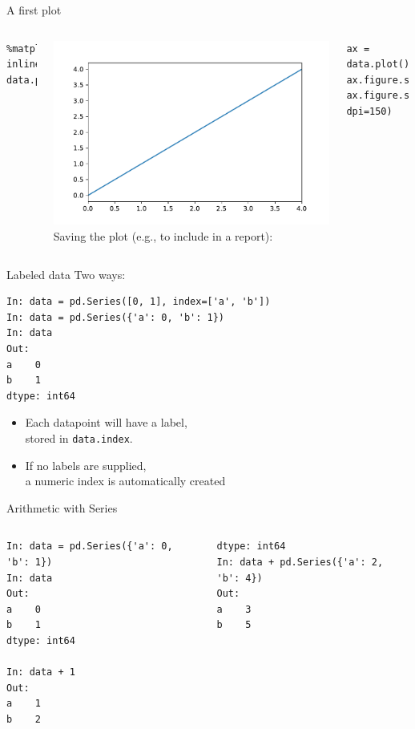 \documentclass[aspectratio=169,usenames,dvipsnames]{beamer}
\begin{document}
\begin{frame}[fragile]{A first plot}
\begin{columns}
\begin{lstlisting}
%matplotlib inline
data.plot()
\end{lstlisting}
\includegraphics[height=0.5\textheight]{fig/basicplot}
\pause{}
Saving the plot (e.g., to include in a report):
\begin{lstlisting}
ax = data.plot()
ax.figure.savefig('plot.pdf')
ax.figure.savefig('plot.png', dpi=150)
\end{lstlisting}
\end{columns}
\end{frame}

\begin{frame}[fragile]{Labeled data}
Two ways:
\begin{lstlisting}
In: data = pd.Series([0, 1], index=['a', 'b'])
In: data = pd.Series({'a': 0, 'b': 1})
In: data
Out:
a    0
b    1
dtype: int64
\end{lstlisting}

\begin{itemize}
    \item Each datapoint will have a label, \\
        stored in \texttt{data.index}.
    \item If no labels are supplied, \\
        a numeric index is automatically created
\end{itemize}
\end{frame}


\begin{frame}[fragile]{Arithmetic with Series}
\begin{columns}
\begin{lstlisting}
In: data = pd.Series({'a': 0, 'b': 1})
In: data
Out:
a    0
b    1
dtype: int64

In: data + 1
Out:
a    1
b    2
\end{lstlisting}

\pause{}
\begin{lstlisting}
dtype: int64
In: data + pd.Series({'a': 2, 'b': 4})
Out:
a    3
b    5
\end{lstlisting}
\end{columns}
\end{frame}
\end{document}
